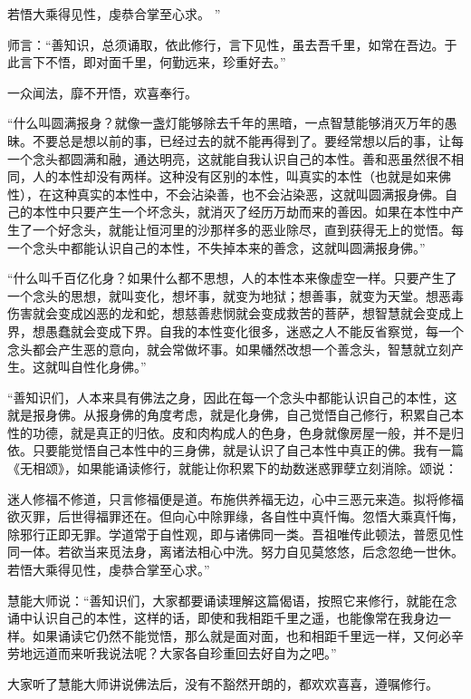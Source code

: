 \documentclass[12pt,twoside,openany]{book}
\newcommand{\kai}[1]{{\CJKfamily{kai}#1}}
\begin{document}
若悟大乘得见性，虔恭合掌至心求。
”

师言：“善知识，总须诵取，依此修行，言下见性，虽去吾千里，如常在吾边。于此言下不悟，即对面千里，何勤远来，珍重好去。”

一众闻法，靡不开悟，欢喜奉行。

\kai{“什么叫圆满报身？就像一盏灯能够除去千年的黑暗，一点智慧能够消灭万年的愚昧。不要总是想以前的事，已经过去的就不能再得到了。要经常想以后的事，让每一个念头都圆满和融，通达明亮，这就能自我认识自己的本性。善和恶虽然很不相同，人的本性却没有两样。这种没有区别的本性，叫真实的本性（也就是如来佛性），在这种真实的本性中，不会沾染善，也不会沾染恶，这就叫圆满报身佛。自己的本性中只要产生一个坏念头，就消灭了经历万劫而来的善因。如果在本性中产生了一个好念头，就能让恒河里的沙那样多的恶业除尽，直到获得无上的觉悟。每一个念头中都能认识自己的本性，不失掉本来的善念，这就叫圆满报身佛。”
	
“什么叫千百亿化身？如果什么都不思想，人的本性本来像虚空一样。只要产生了一个念头的思想，就叫变化，想坏事，就变为地狱；想善事，就变为天堂。想恶毒伤害就会变成凶恶的龙和蛇，想慈善悲悯就会变成救苦的菩萨，想智慧就会变成上界，想愚蠢就会变成下界。自我的本性变化很多，迷惑之人不能反省察觉，每一个念头都会产生恶的意向，就会常做坏事。如果幡然改想一个善念头，智慧就立刻产生。这就叫自性化身佛。”

“善知识们，人本来具有佛法之身，因此在每一个念头中都能认识自己的本性，这就是报身佛。从报身佛的角度考虑，就是化身佛，自己觉悟自己修行，积累自己本性的功德，就是真正的归依。皮和肉构成人的色身，色身就像房屋一般，并不是归依。只要能觉悟自己本性中的三身佛，就是认识了自己本性中真正的佛。我有一篇《无相颂》，如果能诵读修行，就能让你积累下的劫数迷惑罪孽立刻消除。颂说：

迷人修福不修道，只言修福便是道。布施供养福无边，心中三恶元来造。拟将修福欲灭罪，后世得福罪还在。但向心中除罪缘，各自性中真忏悔。忽悟大乘真忏悔，除邪行正即无罪。学道常于自性观，即与诸佛同一类。吾祖唯传此顿法，普愿见性同一体。若欲当来觅法身，离诸法相心中洗。努力自见莫悠悠，后念忽绝一世休。若悟大乘得见性，虔恭合掌至心求。”

慧能大师说：“善知识们，大家都要诵读理解这篇偈语，按照它来修行，就能在念诵中认识自己的本性，这样的话，即使和我相距千里之遥，也能像常在我身边一样。如果诵读它仍然不能觉悟，那么就是面对面，也和相距千里远一样，又何必辛劳地远道而来听我说法呢？大家各自珍重回去好自为之吧。”

大家听了慧能大师讲说佛法后，没有不豁然开朗的，都欢欢喜喜，遵嘱修行。}
\end{document}
